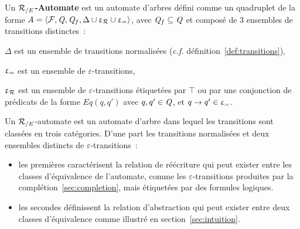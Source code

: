 \begin{definition}
  \label{def:re-automaton}
  Un \textbf{${\mathcal R_{/E}}$-Automate} est un automate d'arbres défini comme un quadruplet de la forme
  $\mathit A= \langle \mathcal{F}, \mathit Q, \mathit Q_f,\Delta \cup \upvarepsilon_{\mathcal R} \cup \upvarepsilon_{=}\rangle$,
  avec $\mathit Q_f \subseteq \mathit Q$ et composé de 3 ensembles de transitions distinctes~:

  \begin{description}
  \item $\Delta$ est un ensemble de transitions normalisées (\textit{c.f.} définition~\ref{def:transitions}),
  \item $\upvarepsilon_{=}$ est un ensemble de $\varepsilon$-transitions,
  \item $\upvarepsilon_{\mathcal R}$ est un ensemble de 
  $\varepsilon$-transitions étiquetées par $\top$ ou par une conjonction de prédicats de la forme $Eq(q, q')$ 
  avec $q, q' \in \mathit Q$, et $q \rightarrow q' \in \upvarepsilon_{=}$.
  \end{description}
\end{definition}


Un ${\mathcal R_{/E}}$-automate est un automate d'arbre dans lequel les transitions sont classées en trois catégories.  D'une part les
transitions normalisées et deux ensembles distincts de $\varepsilon$-transitions~:
\begin{itemize}
\item les premières caractérisent la relation de réécriture qui peut exister entre les classes
  d'équivalence de l'automate, comme les $\varepsilon$-transitions produites par la complétion~\ref{sec:completion}, 
  mais étiquetées par des formules logiques.

\item les secondes définissent la relation d'abstraction qui peut exister entre deux classes d'équivalence comme illustré en 
  section~\ref{sec:intuition}.
\end{itemize}







